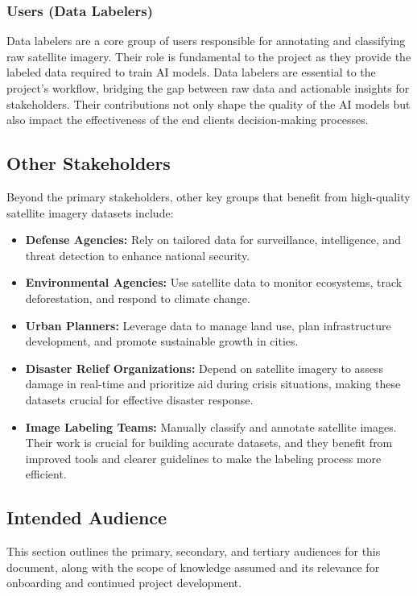 \documentclass{article}
\begin{document}
\subsubsection{Users (Data Labelers)}
Data labelers are a core group of users responsible for annotating and classifying raw satellite imagery. Their role is fundamental to the project as they provide the labeled data required to train AI models. Data labelers are essential to the project's workflow, bridging the gap between raw data and actionable insights for stakeholders. Their contributions not only shape the quality of the AI models but also impact the effectiveness of the end clients decision-making processes.


\subsection{Other Stakeholders}
Beyond the primary stakeholders, other key groups that benefit from high-quality satellite imagery datasets include:
\begin{itemize}
    \item \textbf{Defense Agencies:} Rely on tailored data for surveillance, intelligence, and threat detection to enhance national security.
    \item \textbf{Environmental Agencies:} Use satellite data to monitor ecosystems, track deforestation, and respond to climate change.
    \item \textbf{Urban Planners:} Leverage data to manage land use, plan infrastructure development, and promote sustainable growth in cities.
    \item \textbf{Disaster Relief Organizations:} Depend on satellite imagery to assess damage in real-time and prioritize aid during crisis situations, making these datasets crucial for effective disaster response.
    \item \textbf{Image Labeling Teams:} Manually classify and annotate satellite images. Their work is crucial for building accurate datasets, and they benefit from improved tools and clearer guidelines to make the labeling process more efficient.
\end{itemize}

\subsection{Intended Audience}

This section outlines the primary, secondary, and tertiary audiences for this document, along with the scope of knowledge assumed and its relevance for onboarding and continued project development.
\end{document}
